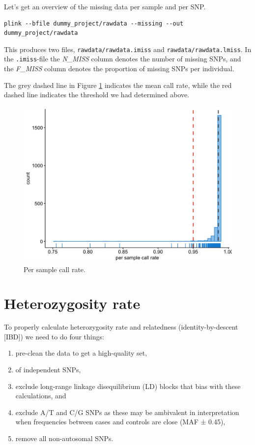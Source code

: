 \documentclass[
]{book}
\newcommand{\passthrough}[1]{#1}
\providecommand{\tightlist}{%
  \setlength{\itemsep}{0pt}\setlength{\parskip}{0pt}}
\begin{document}
Let's get an overview of the missing data per sample and per SNP.

\begin{lstlisting}
plink --bfile dummy_project/rawdata --missing --out dummy_project/rawdata
\end{lstlisting}

This produces two files, \passthrough{\lstinline!rawdata/rawdata.imiss!} and \passthrough{\lstinline!rawdata/rawdata.lmiss!}. In the \passthrough{\lstinline!.imiss!}-file the \emph{N\_MISS} column denotes the number of missing SNPs, and the \emph{F\_MISS} column denotes the proportion of missing SNPs per individual.

The grey dashed line in Figure \ref{fig:showsamplecallrate} indicates the mean call rate, while the red dashed line indicates the threshold we had determined above.

\begin{figure}[H]

{\centering \includegraphics[width=0.85\linewidth]{img/_gwas_dummy/gwas-qc-sample-callrate} 

}

\caption{Per sample call rate.}\label{fig:showsamplecallrate}
\end{figure}

\hypertarget{heterozygosity-rate}{%
\section{Heterozygosity rate}\label{heterozygosity-rate}}

To properly calculate heterozygosity rate and relatedness (identity-by-descent {[}IBD{]}) we need to do four things:

\begin{enumerate}
\def\labelenumi{\arabic{enumi})}
\tightlist
\item
  pre-clean the data to get a high-quality set,
\item
  of independent SNPs,
\item
  exclude long-range linkage disequilibrium (LD) blocks that bias with these calculations, and
\item
  exclude A/T and C/G SNPs as these may be ambivalent in interpretation when frequencies between cases and controls are close (MAF ± 0.45),
\item
  remove all non-autosomal SNPs.
\end{enumerate}
\end{document}
